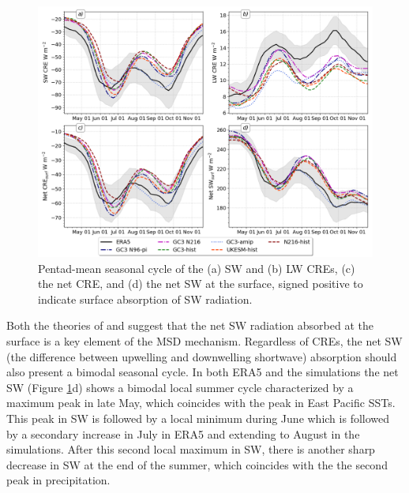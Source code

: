 \begin{figure}[t!]
\includegraphics[width=\linewidth]{figures/cre_index_seasonal.png}
\caption{Pentad-mean seasonal cycle of the (a) SW and (b)  LW CREs, (c) the net CRE, and (d) the net SW at the surface, signed positive to indicate surface absorption of SW radiation.}
\label{fig:cre_seasonal}
\end{figure}

Both the theories of \cite{magana1999} and \cite{karnauskas2013} suggest that the net SW radiation absorbed at the surface is a key element of the MSD mechanism. Regardless of CREs, the net SW (the difference between upwelling and downwelling shortwave) absorption should also present a bimodal seasonal cycle.
In both ERA5 and the simulations the net SW (Figure \ref{fig:cre_seasonal}d) shows a bimodal local summer cycle characterized by a maximum peak in late May, which coincides with the peak in East Pacific SSTs. This peak in SW is followed by a local minimum during June which is followed by a secondary increase in July in ERA5 and extending to August in the simulations. After this second local maximum in SW, there is another sharp decrease in SW at the end of the summer, which coincides with the the second peak in precipitation. 

